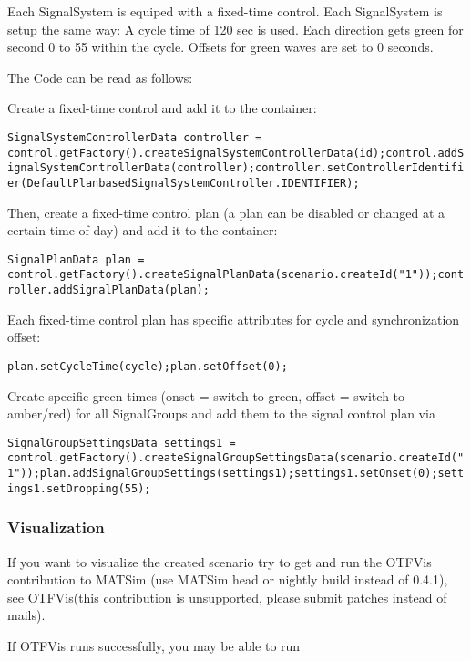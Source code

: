 Each SignalSystem is equiped with a fixed-time control. Each SignalSystem is setup the same way: A cycle time of 120 sec is used. Each direction gets green for second 0 to 55 within the cycle. Offsets for green waves are set to 0 seconds.

The Code can be read as follows:

Create a fixed-time control and add it to the container:


\texttt{\nolinebreak  SignalSystemControllerData controller = control.getFactory().createSignalSystemControllerData(id);\nolinebreak control.addSignalSystemControllerData(controller);\nolinebreak controller.setControllerIdentifier(DefaultPlanbasedSignalSystemController.IDENTIFIER);\nolinebreak }

Then, create a fixed-time control plan (a plan can be disabled or changed at a certain time of day) and add it to the container:


\texttt{\nolinebreak    SignalPlanData plan = control.getFactory().createSignalPlanData(scenario.createId("1"));\nolinebreak    controller.addSignalPlanData(plan);\nolinebreak  }

Each fixed-time control plan has specific attributes for cycle and synchronization offset:


\texttt{\nolinebreak    plan.setCycleTime(cycle);\nolinebreak   plan.setOffset(0);\nolinebreak }

Create specific green times (onset = switch to green, offset = switch to amber/red) for all SignalGroups and add them to the signal control plan via


\texttt{\nolinebreak    SignalGroupSettingsData settings1 = control.getFactory().createSignalGroupSettingsData(scenario.createId("1"));\nolinebreak   plan.addSignalGroupSettings(settings1);\nolinebreak   settings1.setOnset(0);\nolinebreak   settings1.setDropping(55);\nolinebreak }

\subsubsection{Visualization}

If you want to visualize the created scenario try to get and run the OTFVis contribution to MATSim (use MATSim head or nightly build instead of 0.4.1), see \href{http://matsim.org/docs/extensions/otfvis}{OTFVis}(this contribution is unsupported, please submit patches instead of mails).

If OTFVis runs successfully, you may be able to run


